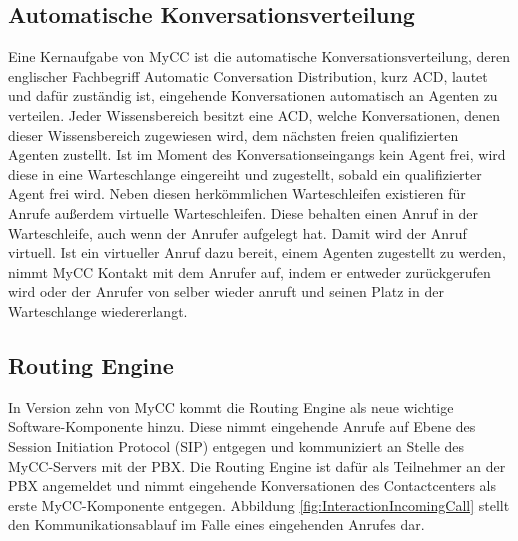 \newpage

\subsection{Automatische Konversationsverteilung}
\label{subsec:Automatische Kontaktverteilung}
Eine Kernaufgabe von MyCC ist die automatische Konversationsverteilung, deren englischer Fachbegriff Automatic Conversation Distribution, kurz ACD, lautet und dafür zuständig ist, eingehende Konversationen automatisch an Agenten zu verteilen. Jeder Wissensbereich besitzt eine ACD, welche Konversationen, denen dieser Wissensbereich zugewiesen wird, dem nächsten freien qualifizierten Agenten zustellt. Ist im Moment des Konversationseingangs kein Agent frei, wird diese in eine Warteschlange eingereiht und zugestellt, sobald ein qualifizierter Agent frei wird. Neben diesen herkömmlichen Warteschleifen existieren für Anrufe außerdem virtuelle Warteschleifen. Diese behalten einen Anruf in der Warteschleife, auch wenn der Anrufer aufgelegt hat. Damit wird der Anruf virtuell. Ist ein virtueller Anruf dazu bereit, einem Agenten zugestellt zu werden, nimmt MyCC Kontakt mit dem Anrufer auf, indem er entweder zurückgerufen wird oder der Anrufer von selber wieder anruft und seinen Platz in der Warteschlange wiedererlangt.

\newpage

\subsection{Routing Engine}
\label{subsec:Routing Engine}
In Version zehn von MyCC kommt die Routing Engine als neue wichtige Software-Komponente hinzu. Diese nimmt eingehende Anrufe auf Ebene des Session Initiation Protocol (SIP) entgegen und kommuniziert an Stelle des MyCC-Servers mit der PBX. Die Routing Engine ist dafür als Teilnehmer an der PBX angemeldet und nimmt eingehende Konversationen des Contactcenters als erste MyCC-Komponente entgegen. Abbildung \ref{fig:InteractionIncomingCall} stellt den Kommunikationsablauf im Falle eines eingehenden Anrufes dar. 

